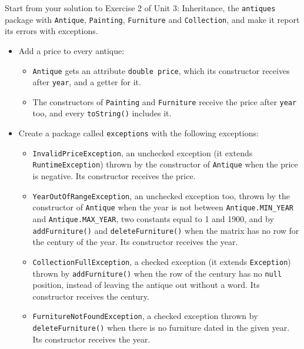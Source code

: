 Start from your solution to Exercise 2 of Unit 3: Inheritance, the \texttt{antiques} package with \texttt{Antique}, \texttt{Painting}, \texttt{Furniture} and \texttt{Collection}, and make it report its errors with exceptions.

\begin{itemize}

    \item Add a price to every antique:

        \begin{itemize}

            \item \texttt{Antique} gets an attribute \texttt{double price}, which its constructor receives after \texttt{year}, and a getter for it.

            \item The constructors of \texttt{Painting} and \texttt{Furniture} receive the price after \texttt{year} too, and every \texttt{toString()} includes it.

        \end{itemize}

    \item Create a package called \texttt{exceptions} with the following exceptions:

        \begin{itemize}

            \item \texttt{InvalidPriceException}, an unchecked exception (it extends \texttt{RuntimeException}) thrown by the constructor of \texttt{Antique} when the price is negative. Its constructor receives the price.

            \item \texttt{YearOutOfRangeException}, an unchecked exception too, thrown by the constructor of \texttt{Antique} when the year is not between \texttt{Antique.MIN\_YEAR} and \texttt{Antique.MAX\_YEAR}, two constants equal to 1 and 1900, and by \texttt{addFurniture()} and \texttt{deleteFurniture()} when the matrix has no row for the century of the year. Its constructor receives the year.

            \item \texttt{CollectionFullException}, a checked exception (it extends \texttt{Exception}) thrown by \texttt{addFurniture()} when the row of the century has no \texttt{null} position, instead of leaving the antique out without a word. Its constructor receives the century.

            \item \texttt{FurnitureNotFoundException}, a checked exception thrown by \texttt{deleteFurniture()} when there is no furniture dated in the given year. Its constructor receives the year.


\end{itemize}
\end{itemize}
